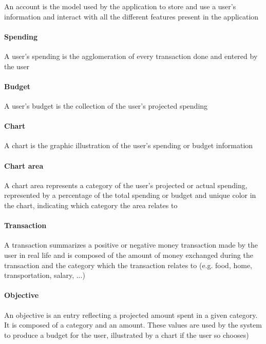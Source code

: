 \documentclass[letterpaper]{article}
\begin{document}
		An account is the model used by the application to store and use a user's information and interact with all the different features present in the application
	
	\paragraph{Spending}
	
		A user's spending is the agglomeration of every transaction done and entered by the user
	
	\paragraph{Budget}
	
		A user's budget is the collection of the user's projected spending
	
	\paragraph{Chart}
	
		A chart is the graphic illustration of the user's spending or budget information
	
	\paragraph{Chart area}
	
		A chart area represents a category of the user's projected or actual spending, represented by a percentage of the total spending or budget and unique color in the chart, indicating which category the area relates to
		
	\paragraph{Transaction}
	
		A transaction summarizes a positive or negative money transaction made by the user in real life and is composed of the amount of money exchanged during the transaction and the category which the transaction relates to (e.g. food, home, transportation, salary, ...)
		
	\paragraph{Objective}
		
		An objective is an entry reflecting a projected amount spent in a given category. It is composed of a category and an amount. These values are used by the system to produce a budget for the user, illustrated by a chart if the user so chooses)
	
\end{document}
